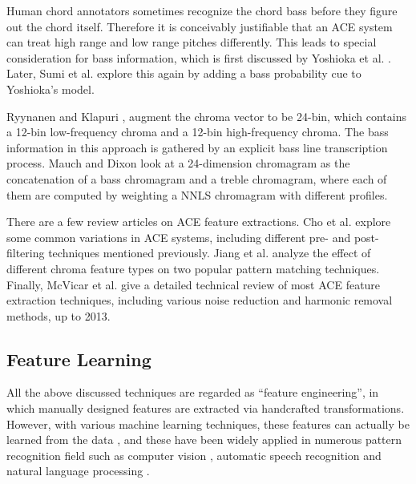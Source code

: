 Human chord annotators sometimes recognize the chord bass before they figure out the chord itself. Therefore it is conceivably justifiable that an ACE system can treat high range and low range pitches differently. This leads to special consideration for bass information, which is first discussed by Yoshioka et al. \cite{yoshioka2004automatic}. Later, Sumi et al. \cite{sumi2008automatic} explore this again by adding a bass probability cue to Yoshioka's model.

Ryynanen and Klapuri \cite{ryynanen2008automatic}, augment the chroma vector to be 24-bin, which contains a 12-bin low-frequency chroma and a 12-bin high-frequency chroma. The bass information in this approach is gathered by an explicit bass line transcription process. Mauch and Dixon \cite{mauch2010approximate,mauch2010simultaneous} look at a 24-dimension chromagram as the concatenation of a bass chromagram and a treble chromagram, where each of them are computed by weighting a NNLS chromagram with different profiles.

There are a few review articles on ACE feature extractions. Cho et al. \cite{cho2010exploring} explore some common variations in ACE systems, including different pre- and post-filtering techniques mentioned previously. Jiang et al. \cite{jiang2011analyzing} analyze the effect of different chroma feature types on two popular pattern matching techniques. Finally, McVicar et al. \cite{mcvicar2014automatic} give a detailed technical review of most ACE feature extraction techniques, including various noise reduction and harmonic removal methods, up to 2013.


\subsection{Feature Learning} \label{sec:2-fl}
All the above discussed techniques are regarded as ``feature engineering'', in which manually designed features are extracted via handcrafted transformations. However, with various machine learning techniques, these features can actually be learned from the data \cite{bengio2009learning}, and these have been widely applied in numerous pattern recognition field such as computer vision \cite{hinton2006reducing}, automatic speech recognition and natural language processing \cite{deng2014deep}.

